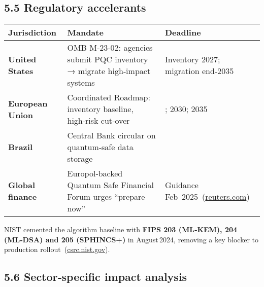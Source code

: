 \documentclass[
  english,
]{article}
\begin{document}
\subsection{5.5 Regulatory accelerants}\label{regulatory-accelerants}

\begin{longtable}[]{@{}
  >{\raggedright\arraybackslash}p{}
  >{\raggedright\arraybackslash}p{}
  >{\raggedright\arraybackslash}p{}@{}}
\toprule\noalign{}
\begin{minipage}[b]{\linewidth}\raggedright
Jurisdiction
\end{minipage} & \begin{minipage}[b]{\linewidth}\raggedright
Mandate
\end{minipage} & \begin{minipage}[b]{\linewidth}\raggedright
Deadline
\end{minipage} \\
\midrule\noalign{}
\endhead
\bottomrule\noalign{}
\endlastfoot
\textbf{United States} & OMB M‑23‑02: agencies submit PQC inventory →
migrate high‑impact systems & Inventory 2027; migration end‑2035 \\
\textbf{European Union} & Coordinated Roadmap: inventory baseline,
high‑risk cut‑over & 2026; 2030; 2035 \\
\textbf{Brazil} & Central Bank circular on quantum‑safe data storage &
2032 \\
\textbf{Global finance} & Europol‑backed Quantum Safe Financial Forum
urges ``prepare now'' & Guidance
Feb~2025~(\href{https://www.reuters.com/technology/cybersecurity/europol-body-banks-should-prepare-quantum-computer-risk-now-2025-02-07/?utm_source=chatgpt.com}{reuters.com}) \\
\end{longtable}

NIST cemented the algorithm baseline with \textbf{FIPS 203 (ML‑KEM), 204
(ML‑DSA) and 205 (SPHINCS+)} in August\,2024, removing a key blocker to
production
rollout~(\href{https://csrc.nist.gov/news/2024/postquantum-cryptography-fips-approved?utm_source=chatgpt.com}{csrc.nist.gov}).

\subsection{5.6 Sector‑specific impact
analysis}\label{sectorspecific-impact-analysis}
\end{document}
